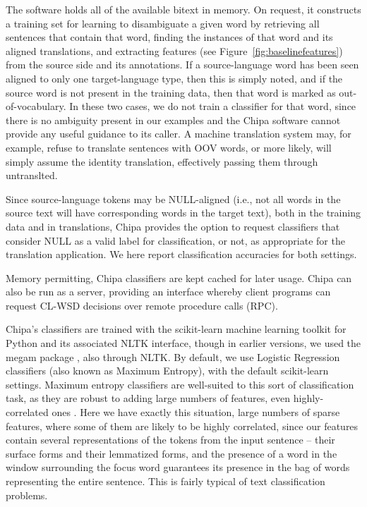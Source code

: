 The software holds all of the available bitext in memory. On request, it
constructs a training set for learning to disambiguate a given word
by retrieving all sentences that contain that word,
finding the instances of that word and its aligned translations, and extracting
features (see Figure~\ref{fig:baselinefeatures}) from the source side and its
annotations.
If a source-language word has been seen aligned to only one target-language
type, then this is simply noted, and if the source word is not present in the
training data, then that word is marked as out-of-vocabulary. In these two
cases, we do not train a classifier for that word, since there is no
ambiguity present in our examples and the Chipa software cannot provide any
useful guidance to its caller. A machine translation system may, for example,
refuse to translate sentences with OOV words, or more likely, will simply
assume the identity translation, effectively passing them through untranslted.

Since source-language tokens may be NULL-aligned (i.e., not all words in the
source text will have corresponding words in the target text), both in the
training data and in translations, Chipa provides the option to request
classifiers that consider NULL as a valid label for classification, or not, as
appropriate for the translation application. We here report classification
accuracies for both settings.

Memory permitting, Chipa classifiers are kept cached for later usage. Chipa can
also be run as a server, providing an interface whereby client programs can
request CL-WSD decisions over remote procedure calls (RPC).

Chipa's classifiers are trained with the scikit-learn machine learning toolkit
\cite{scikit-learn} for Python and its associated NLTK interface, though in
earlier versions, we used the megam package \cite{daume04cg-bfgs}, also through
NLTK. By default, we use Logistic Regression classifiers (also known as
Maximum Entropy), with the default scikit-learn settings.
Maximum entropy classifiers are well-suited to this sort of classification
task, as they are robust to adding large numbers of features, even
highly-correlated ones \cite{nigam1999using}. Here we have exactly this
situation, large numbers of sparse features, where some of them are likely to
be highly correlated, since our features contain several representations of the
tokens from the input sentence -- their surface forms and their lemmatized
forms, and the presence of a word in the window surrounding the focus word
guarantees its presence in the bag of words representing the entire sentence.
This is fairly typical of text classification problems.

